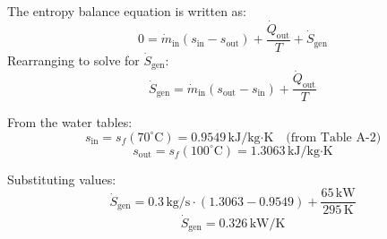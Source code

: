 The entropy balance equation is written as:  
\[
0 = \dot{m}_{\text{in}} \left( s_{\text{in}} - s_{\text{out}} \right) + \frac{\dot{Q}_{\text{out}}}{T} + \dot{S}_{\text{gen}}
\]  
Rearranging to solve for \( \dot{S}_{\text{gen}} \):  
\[
\dot{S}_{\text{gen}} = \dot{m}_{\text{in}} \left( s_{\text{out}} - s_{\text{in}} \right) + \frac{\dot{Q}_{\text{out}}}{T}
\]  

From the water tables:  
\[
s_{\text{in}} = s_f(70^\circ\text{C}) = 0.9549 \, \text{kJ/kg·K} \quad \text{(from Table A-2)}
\]  
\[
s_{\text{out}} = s_f(100^\circ\text{C}) = 1.3063 \, \text{kJ/kg·K}
\]  

Substituting values:  
\[
\dot{S}_{\text{gen}} = 0.3 \, \text{kg/s} \cdot \left( 1.3063 - 0.9549 \right) + \frac{65 \, \text{kW}}{295 \, \text{K}}
\]  
\[
\dot{S}_{\text{gen}} = 0.326 \, \text{kW/K}
\]